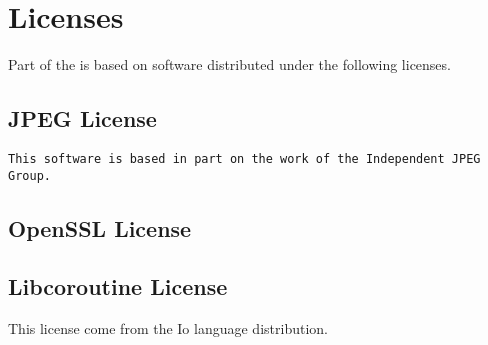 
\chapter{Licenses}
\label{sec:licenses}

Part of the \usdk is based on software distributed under the
following licenses.


\section{JPEG License}

\begin{lstlisting}[language={},basicstyle={\ttfamily\footnotesize}]
This software is based in part on the work of the Independent JPEG Group.
\end{lstlisting}

\section{OpenSSL License}



\section{Libcoroutine License}

This license come from the Io language distribution.



